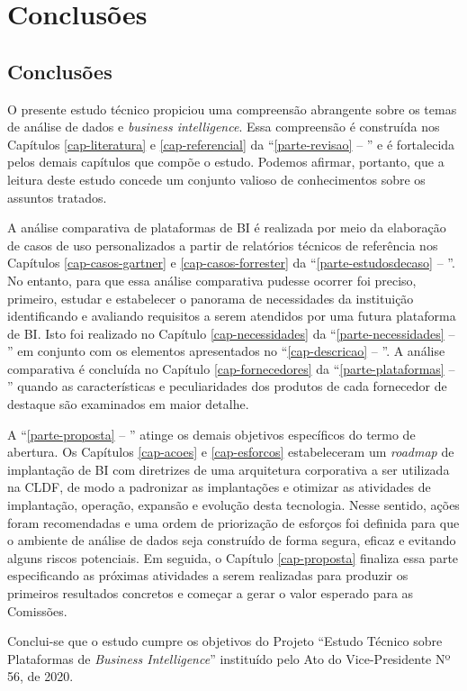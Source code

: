 \part{Conclusões}
\label{parte-conclusoes}

\chapter{Conclusões}
\label{cap-conclusoes}

O presente estudo técnico propiciou uma compreensão abrangente sobre os temas de análise de dados e \emph{business intelligence}. Essa compreensão é construída nos Capítulos \ref{cap-literatura} e \ref{cap-referencial} da ``\autoref{parte-revisao} -- '' e é fortalecida pelos demais capítulos que compõe o estudo. Podemos afirmar, portanto, que a leitura deste estudo concede um conjunto valioso de conhecimentos sobre os assuntos tratados. 

A análise comparativa de plataformas de BI é realizada por meio da elaboração de casos de uso personalizados a partir de relatórios técnicos de referência nos Capítulos \ref{cap-casos-gartner} e \ref{cap-casos-forrester} da ``\autoref{parte-estudosdecaso} -- ''. No entanto, para que essa análise comparativa pudesse ocorrer foi preciso, primeiro, estudar e estabelecer o panorama de necessidades da instituição identificando e avaliando requisitos a serem atendidos por uma futura plataforma de BI. Isto foi realizado no Capítulo \ref{cap-necessidades} da ``\autoref{parte-necessidades} -- '' em conjunto com os elementos apresentados no ``\autoref{cap-descricao} -- ''. A análise comparativa é concluída no Capítulo \ref{cap-fornecedores} da ``\autoref{parte-plataformas} -- '' quando as características e peculiaridades dos produtos de cada fornecedor de destaque são examinados em maior detalhe.

A ``\autoref{parte-proposta} -- '' atinge os demais objetivos específicos do termo de abertura. Os Capítulos \ref{cap-acoes} e \ref{cap-esforcos} estabeleceram um \emph{roadmap} de implantação de BI com diretrizes de uma arquitetura corporativa a ser utilizada na CLDF, de modo a padronizar as implantações e otimizar as atividades de implantação, operação, expansão e evolução desta tecnologia. Nesse sentido, ações foram recomendadas e uma ordem de priorização de esforços foi definida para que o ambiente de análise de dados seja construído de forma segura, eficaz e evitando alguns riscos potenciais. Em seguida, o Capítulo \ref{cap-proposta} finaliza essa parte especificando as próximas atividades a serem realizadas para produzir os primeiros resultados concretos e começar a gerar o valor esperado para as Comissões.

Conclui-se que o estudo cumpre os objetivos do Projeto ``Estudo Técnico sobre Plataformas de \emph{Business Intelligence}'' instituído pelo Ato do Vice-Presidente Nº 56, de 2020.
